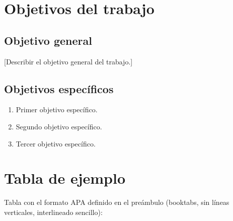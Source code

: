 
\section{Objetivos del trabajo}

\subsection{Objetivo general}

[Describir el objetivo general del trabajo.]

\subsection{Objetivos específicos}

\begin{enumerate}
  \item Primer objetivo específico.
  \item Segundo objetivo específico.
  \item Tercer objetivo específico.
\end{enumerate}

\section{Tabla de ejemplo}

Tabla con el formato APA definido en el preámbulo (booktabs, sin líneas
verticales, interlineado sencillo):

\begin{table}[H]
  \centering
  \caption{Materiales y herramientas utilizados}
\end{table}
